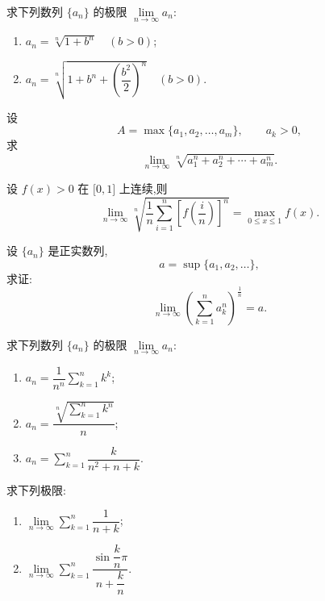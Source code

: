 \documentclass[../数学分析培优讲义.tex]{subfiles}
\begin{document}
\begin{example}
求下列数列 $\{a_n\}$ 的极限 $\displaystyle \lim\limits_{n\to\infty}a_n$:
\begin{enumerate}[label=(\arabic*)]
  \item $\displaystyle a_n=\sqrt[n]{1+b^n}\quad(b>0)$;
  \item $\displaystyle a_n=\sqrt[n]{1+b^n+\left(\dfrac{b^2}{2}\right)^n}\quad(b>0)$.
\end{enumerate}
\end{example}
\exampleblank

\begin{example}[\markstar]
设
\[
A=\max\{a_1,a_2,\ldots,a_m\},\qquad a_k>0,
\]
求
\[
\lim\limits_{n\to\infty}\sqrt[n]{a_1^n+a_2^n+\cdots+a_m^n}.
\]
\end{example}
\exampleblank

\begin{example}[\markstar]
设 $f(x)>0$ 在 $\lbrack 0,1\rbrack$ 上连续,则
\[
\lim\limits_{n\to\infty}
\sqrt[n]{\dfrac{1}{n}\sum\limits_{i=1}^n\left[f\left(\dfrac{i}{n}\right)\right]^n}
=
\max_{0\leq x\leq1}f(x).
\]
\end{example}
\exampleblank

\begin{example}[\markstar]
设 $\{a_n\}$ 是正实数列,
\[
a=\sup\{a_1,a_2,\ldots\},
\]
求证:
\[
\lim\limits_{n\to\infty}\left(\sum\limits_{k=1}^n a_k^n\right)^{\frac{1}{n}}=a.
\]
\end{example}
\exampleblank

\begin{example}
求下列数列 $\{a_n\}$ 的极限 $\displaystyle \lim\limits_{n\to\infty}a_n$:
\begin{enumerate}[label=(\arabic*)]
  \item $\displaystyle a_n=\dfrac{1}{n^n}\sum\limits_{k=1}^n k^k$;
  \item $\displaystyle a_n=\dfrac{\sqrt[n]{\sum\limits_{k=1}^n k^n}}{n}$;
  \item $\displaystyle a_n=\sum\limits_{k=1}^n\dfrac{k}{n^2+n+k}$.
\end{enumerate}
\end{example}
\exampleblank


\newpage


\begin{example}
求下列极限:
\begin{enumerate}[label=(\arabic*)]
  \item $\displaystyle \lim\limits_{n\to\infty}\sum\limits_{k=1}^n\dfrac{1}{n+k}$;
  \item $\displaystyle \lim\limits_{n\to\infty}\sum\limits_{k=1}^n
  \dfrac{\sin\dfrac{k}{n}\pi}{n+\dfrac{k}{n}}$.
\end{enumerate}
\end{example}
\exampleblank
\end{document}
